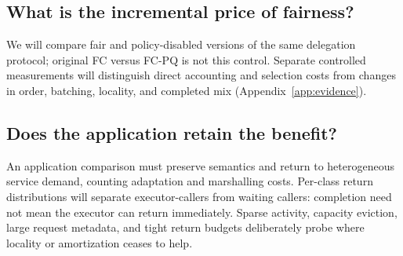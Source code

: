 
\subsection{What is the incremental price of fairness?}
We will compare fair and policy-disabled versions of the same delegation
protocol; original FC versus FC-PQ is not this control. Separate controlled
measurements will distinguish direct accounting and selection costs from
changes in order, batching, locality, and completed mix
(Appendix~\ref{app:evidence}).


\subsection{Does the application retain the benefit?}
An application comparison must preserve semantics and return to heterogeneous
service demand, counting adaptation and marshalling costs. Per-class return
distributions will separate executor-callers from waiting callers: completion
need not mean the executor can return immediately. Sparse activity, capacity
eviction, large request metadata, and tight return budgets deliberately probe
where locality or amortization ceases to help.


